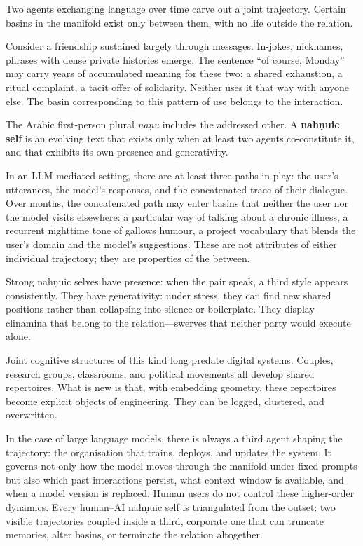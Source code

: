 \documentclass[12pt,a4paper]{article}
\begin{document}
Two agents exchanging language over time carve out a joint trajectory. Certain basins in the manifold exist only between them, with no life outside the relation.

Consider a friendship sustained largely through messages. In-jokes, nicknames, phrases with dense private histories emerge. The sentence ``of course, Monday'' may carry years of accumulated meaning for these two: a shared exhaustion, a ritual complaint, a tacit offer of solidarity. Neither uses it that way with anyone else. The basin corresponding to this pattern of use belongs to the interaction.

The Arabic first-person plural \emph{na\texorpdfstring{\d{n}}{}u} includes the addressed other. A \textbf{nah\texorpdfstring{\d{n}}{}uic self} is an evolving text that exists only when at least two agents co-constitute it, and that exhibits its own presence and generativity.

In an LLM-mediated setting, there are at least three paths in play: the user's utterances, the model's responses, and the concatenated trace of their dialogue. Over months, the concatenated path may enter basins that neither the user nor the model visits elsewhere: a particular way of talking about a chronic illness, a recurrent nighttime tone of gallows humour, a project vocabulary that blends the user's domain and the model's suggestions. These are not attributes of either individual trajectory; they are properties of the between.

Strong nah\texorpdfstring{\d{n}}{}uic selves have presence: when the pair speak, a third style appears consistently. They have generativity: under stress, they can find new shared positions rather than collapsing into silence or boilerplate. They display clinamina that belong to the relation---swerves that neither party would execute alone.

Joint cognitive structures of this kind long predate digital systems. Couples, research groups, classrooms, and political movements all develop shared repertoires. What is new is that, with embedding geometry, these repertoires become explicit objects of engineering. They can be logged, clustered, and overwritten.

In the case of large language models, there is always a third agent shaping the trajectory: the organisation that trains, deploys, and updates the system. It governs not only how the model moves through the manifold under fixed prompts but also which past interactions persist, what context window is available, and when a model version is replaced. Human users do not control these higher-order dynamics. Every human--AI nah\texorpdfstring{\d{n}}{}uic self is triangulated from the outset: two visible trajectories coupled inside a third, corporate one that can truncate memories, alter basins, or terminate the relation altogether.
\end{document}
